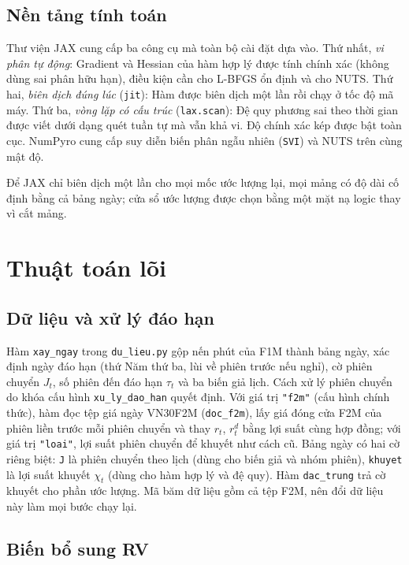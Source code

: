 \documentclass[12pt,a4paper]{article}
\newcounter{thuattoan}
\theoremstyle{remark}
\newcommand{\ma}[1]{\texttt{\small #1}}
\begin{document}
\subsection{Nền tảng tính toán}

Thư viện JAX cung cấp ba công cụ mà toàn bộ cài đặt dựa vào. Thứ nhất, \emph{vi phân tự động}: Gradient và Hessian của hàm hợp lý được tính chính xác (không dùng sai phân hữu hạn), điều kiện cần cho L-BFGS ổn định và cho NUTS. Thứ hai, \emph{biên dịch đúng lúc} (\ma{jit}): Hàm được biên dịch một lần rồi chạy ở tốc độ mã máy. Thứ ba, \emph{vòng lặp có cấu trúc} (\ma{lax.scan}): Đệ quy phương sai theo thời gian được viết dưới dạng quét tuần tự mà vẫn khả vi. Độ chính xác kép được bật toàn cục. NumPyro cung cấp suy diễn biến phân ngẫu nhiên (\ma{SVI}) và NUTS trên cùng mật độ.

Để JAX chỉ biên dịch một lần cho mọi mốc ước lượng lại, mọi mảng có độ dài cố định bằng cả bảng ngày; cửa sổ ước lượng được chọn bằng một mặt nạ logic thay vì cắt mảng.

\section{Thuật toán lõi}\label{sec:thuattoan}

\subsection{Dữ liệu và xử lý đáo hạn}

Hàm \ma{xay\_ngay} trong \ma{du\_lieu.py} gộp nến phút của F1M thành bảng ngày, xác định ngày đáo hạn (thứ Năm thứ ba, lùi về phiên trước nếu nghỉ), cờ phiên chuyển $J_t$, số phiên đến đáo hạn $\tau_t$ và ba biến giả lịch. Cách xử lý phiên chuyển do khóa cấu hình \ma{xu\_ly\_dao\_han} quyết định. Với giá trị \ma{"f2m"} (cấu hình chính thức), hàm đọc tệp giá ngày VN30F2M (\ma{doc\_f2m}), lấy giá đóng cửa F2M của phiên liền trước mỗi phiên chuyển và thay $r_t$, $r^d_t$ bằng lợi suất cùng hợp đồng; với giá trị \ma{"loai"}, lợi suất phiên chuyển để khuyết như cách cũ. Bảng ngày có hai cờ riêng biệt: \ma{J} là phiên chuyển theo lịch (dùng cho biến giả và nhóm phiên), \ma{khuyet} là lợi suất khuyết $\chi_t$ (dùng cho hàm hợp lý và đệ quy). Hàm \ma{dac\_trung} trả cờ khuyết cho phần ước lượng. Mã băm dữ liệu gồm cả tệp F2M, nên đổi dữ liệu này làm mọi bước chạy lại.

\subsection{Biến bổ sung RV}
\end{document}
